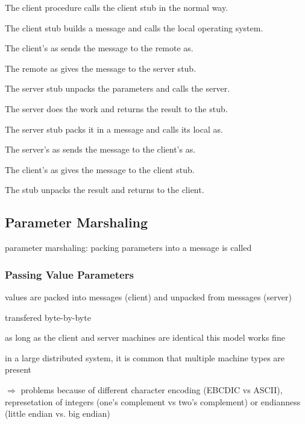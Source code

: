 \documentclass[ngerman,a4paper]{report}
\begin{document}
\begin{compactenum}
	\item The client procedure calls the client stub in the normal way.
	\item The client stub builds a message and calls the local operating system.
	\item The client's as sends the message to the remote as.
	\item The remote as gives the message to the server stub.
	\item The server stub unpacks the parameters and calls the server.
	\item The server does the work and returns the result to the stub.
	\item The server stub packs it in a message and calls its local as.
	\item The server's as sends the message to the client's as.
	\item The client's as gives the message to the client stub.
	\item The stub unpacks the result and returns to the client.
\end{compactenum}

\subsection*{Parameter Marshaling}

parameter marshaling: packing parameters into a message is called


\subsubsection*{Passing Value Parameters}

\begin{compactitem}
	\item values are packed into messages (client) and unpacked from messages (server)
	\item transfered byte-by-byte
	\item as long as the client and server machines are identical this model works fine
	\item in a large distributed system, it is common that multiple machine types are present
	\item $\Rightarrow$ problems because of different character encoding (EBCDIC vs ASCII), represetation of integers (one's complement vs two's complement) or endianness (little endian vs. big endian)
\end{compactitem}
\end{document}
